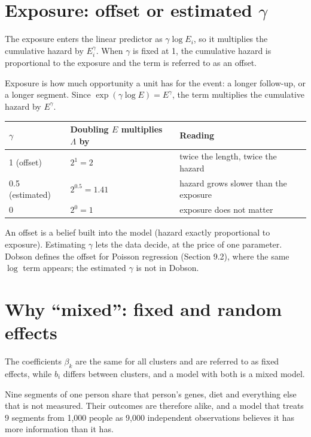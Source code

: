 \documentclass[11pt]{article}
\begin{document}
\section{Exposure: offset or estimated $\gamma$}

\begin{thesisline}
The exposure enters the linear predictor as $\gamma \log E_i$, so it multiplies the cumulative
hazard by $E_i^{\gamma}$. When $\gamma$ is fixed at 1, the cumulative hazard is proportional to the
exposure and the term is referred to as an offset.
\end{thesisline}

Exposure is how much opportunity a unit has for the event: a longer follow-up, or a longer segment.
Since $\exp(\gamma \log E) = E^{\gamma}$, the term multiplies the cumulative hazard by $E^\gamma$.

\begin{center}
\begin{tabular}{lll}
\toprule
$\gamma$ & Doubling $E$ multiplies $\Lambda$ by & Reading \\
\midrule
1 (offset) & $2^1 = 2$ & twice the length, twice the hazard \\
0.5 (estimated) & $2^{0.5} = 1.41$ & hazard grows slower than the exposure \\
0 & $2^0 = 1$ & exposure does not matter \\
\bottomrule
\end{tabular}
\end{center}

An offset is a belief built into the model (hazard exactly proportional to exposure). Estimating
$\gamma$ lets the data decide, at the price of one parameter. Dobson defines the offset for Poisson
regression (Section 9.2), where the same $\log$ term appears; the estimated $\gamma$ is not in
Dobson.

\section{Why ``mixed'': fixed and random effects}

\begin{thesisline}
The coefficients $\beta_k$ are the same for all clusters and are referred to as fixed effects, while
$b_i$ differs between clusters, and a model with both is a mixed model.
\end{thesisline}

Nine segments of one person share that person's genes, diet and everything else that is not
measured. Their outcomes are therefore alike, and a model that treats 9 segments from 1,000 people
as 9,000 independent observations believes it has more information than it has.
\end{document}
